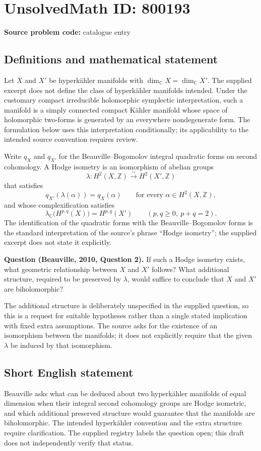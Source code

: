 \documentclass[11pt]{article}
\newcommand{\Z}{\mathbb{Z}}
\newcommand{\C}{\mathbb{C}}
\begin{document}
\section*{UnsolvedMath ID: 800193}
\textbf{Source problem code:} catalogue entry
\subsection{Definitions and mathematical statement}
Let \(X\) and \(X'\) be hyperk\"ahler manifolds with \(\dim_{\C}X=\dim_{\C}X'\). The supplied excerpt does not define the class of hyperk\"ahler manifolds intended. Under the customary compact irreducible holomorphic symplectic interpretation, such a manifold is a simply connected compact K\"ahler manifold whose space of holomorphic two-forms is generated by an everywhere nondegenerate form. The formulation below uses this interpretation conditionally; its applicability to the intended source convention requires review.

Write \(q_X\) and \(q_{X'}\) for the Beauville--Bogomolov integral quadratic forms on second cohomology. A Hodge isometry is an isomorphism of abelian groups
\[
\lambda:H^2(X,\Z)\xrightarrow{\sim}H^2(X',\Z)
\]
that satisfies
\[
q_{X'}(\lambda(\alpha))=q_X(\alpha)
\qquad\text{for every }\alpha\in H^2(X,\Z),
\]
and whose complexification satisfies
\[
\lambda_{\C}\bigl(H^{p,q}(X)\bigr)=H^{p,q}(X')
\qquad(p,q\geq 0,\ p+q=2).
\]
The identification of the quadratic forms with the Beauville--Bogomolov forms is the standard interpretation of the source's phrase ``Hodge isometry''; the supplied excerpt does not state it explicitly.

\textbf{Question (Beauville, 2010, Question 2).} If such a Hodge isometry exists, what geometric relationship between \(X\) and \(X'\) follows? What additional structure, required to be preserved by \(\lambda\), would suffice to conclude that \(X\) and \(X'\) are biholomorphic?

The additional structure is deliberately unspecified in the supplied question, so this is a request for suitable hypotheses rather than a single stated implication with fixed extra assumptions. The source asks for the existence of an isomorphism between the manifolds; it does not explicitly require that the given \(\lambda\) be induced by that isomorphism.
\subsection{Short English statement}
Beauville asks what can be deduced about two hyperk\"ahler manifolds of equal dimension when their integral second cohomology groups are Hodge isometric, and which additional preserved structure would guarantee that the manifolds are biholomorphic. The intended hyperk\"ahler convention and the extra structure require clarification. The supplied registry labels the question open; this draft does not independently verify that status.
\end{document}
